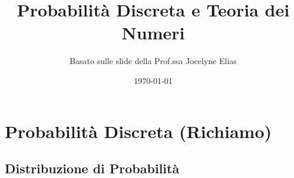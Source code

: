 

\title{Probabilità Discreta e Teoria dei Numeri}
\author{Basato sulle slide della Prof.ssa Jocelyne Elias}
\date{\today}



\maketitle
\tableofcontents
\newpage

\section{Probabilità Discreta (Richiamo)}

\subsection{Distribuzione di Probabilità}

